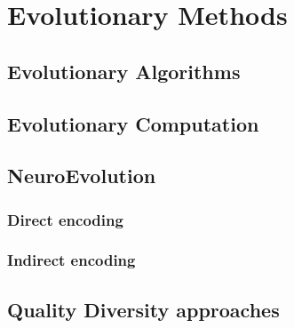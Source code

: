 \chapter{Evolutionary Methods }
\label{sec:evo}

\section{Evolutionary Algorithms}

\section{Evolutionary Computation}

\section{NeuroEvolution}
\subsection{Direct encoding}
\subsection{Indirect encoding}

\section{Quality Diversity approaches}

